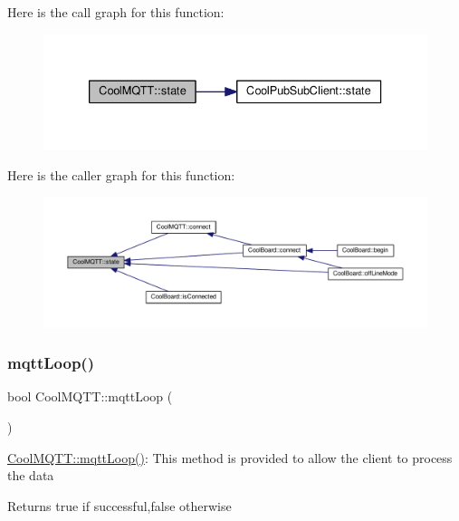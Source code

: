 Here is the call graph for this function\+:\nopagebreak
\begin{figure}[H]
\begin{center}
\leavevmode
\includegraphics[width=333pt]{d0/dd0/class_cool_m_q_t_t_a5d003307eff78efbd585e42b43b72b6d_cgraph}
\end{center}
\end{figure}
Here is the caller graph for this function\+:\nopagebreak
\begin{figure}[H]
\begin{center}
\leavevmode
\includegraphics[width=350pt]{d0/dd0/class_cool_m_q_t_t_a5d003307eff78efbd585e42b43b72b6d_icgraph}
\end{center}
\end{figure}
\mbox{\label{class_cool_m_q_t_t_aa5eaae967b562b62cbcf2b8d81f6e5d5}} 
\subsubsection{\texorpdfstring{mqtt\+Loop()}{mqttLoop()}}
{\footnotesize\ttfamily bool Cool\+M\+Q\+T\+T\+::mqtt\+Loop (\begin{DoxyParamCaption}{ }\end{DoxyParamCaption})}

\hyperlink{class_cool_m_q_t_t_aa5eaae967b562b62cbcf2b8d81f6e5d5}{Cool\+M\+Q\+T\+T\+::mqtt\+Loop()}\+: This method is provided to allow the client to process the data

\begin{DoxyReturn}{Returns}
true if successful,false otherwise 
\end{DoxyReturn}


